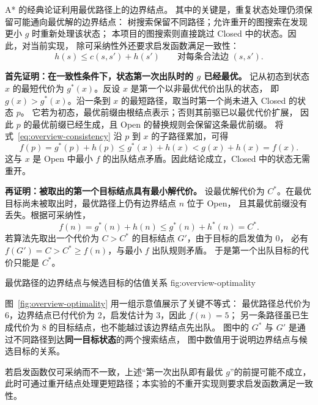 A* 的经典论证利用最优路径上的边界结点\cite{hart1968}。
其中的关键是，重复状态处理仍须保留可能通向最优解的边界结点：
树搜索保留不同路径；允许重开的图搜索在发现更小 $g$ 时重新处理该状态；
本项目的图搜索则直接跳过 Closed 中的状态。因此，对当前实现，
除可采纳性外还要求启发函数满足一致性：
\begin{equation}
  h(s)\leq c(s,s')+h(s')\qquad \text{对每条合法边 }(s,s').
  \label{eq:overview-consistency}
\end{equation}

\textbf{首先证明：在一致性条件下，状态第一次出队时的 $g$ 已经最优。}
记从初态到状态 $x$ 的最短代价为 $g^*(x)$。反设 $x$ 是第一个以非最优代价出队的状态，
即 $g(x)>g^*(x)$。沿一条到 $x$ 的最短路径，取当时第一个尚未进入 Closed 的状态 $p$。
它若为初态，最优前缀由根结点表示；否则其前驱已以最优代价扩展，
因此 $p$ 的最优前缀已经生成，且 Open 的替换规则会保留这条最优前缀。
将式~\eqref{eq:overview-consistency} 沿 $p$ 到 $x$ 的子路径累加，可得
\begin{equation}
  f(p)=g^*(p)+h(p)
  \leq g^*(x)+h(x)
  <g(x)+h(x)=f(x).
  \label{eq:overview-pop-optimal}
\end{equation}
这与 $x$ 是 Open 中最小 $f$ 的出队结点矛盾。因此结论成立，Closed 中的状态无需重开。

\textbf{再证明：被取出的第一个目标结点具有最小解代价。}
设最优解代价为 $C^*$。在最优目标尚未被取出时，最优路径上仍有边界结点 $n$ 位于 Open，
且其最优前缀没有丢失。根据可采纳性，
\begin{equation}
  f(n)=g^*(n)+h(n)\leq g^*(n)+h^*(n)=C^*.
  \label{eq:overview-frontier}
\end{equation}
若算法先取出一个代价为 $C>C^*$ 的目标结点 $G'$，由于目标的启发值为 0，
必有 $f(G')=C>C^*\geq f(n)$，与最小 $f$ 出队规则矛盾。
于是第一个出队目标的代价只能是 $C^*$。

  {最优路径的边界结点与候选目标的估值关系}
  {fig:overview-optimality}

图~\ref{fig:overview-optimality} 用一组示意值展示了关键不等式：
最优路径总代价为 6，边界结点已付代价为 2，启发估计为 3，因此 $f(n)=5$；
另一条路径虽已生成代价为 8 的目标结点，也不能越过该边界结点先出队。
图中的 $G^*$ 与 $G'$ 是通过不同路径到达\textbf{同一目标状态}的两个搜索结点，
图中数值用于说明边界结点与候选目标的关系。

若启发函数仅可采纳而不一致，上述“第一次出队即有最优 $g$”的前提可能不成立，
此时可通过重开结点处理更短路径；本实验的不重开实现则要求启发函数满足一致性。
\FloatBarrier


